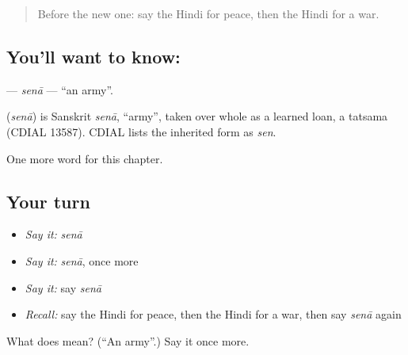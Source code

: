 \begin{quote}
Before the new one: say the Hindi for peace, then the Hindi for a war.
\end{quote}

\subsection*{You'll want to know: }
\textbf{} — \emph{senā} — \textquotedblleft{}an army\textquotedblright{}.

\begin{cousinweb}
\textbf{} (\emph{senā}) is Sanskrit \emph{senā}, \textquotedblleft{}army\textquotedblright{}, taken over whole as a learned loan, a tatsama (CDIAL 13587). CDIAL lists the inherited form as \emph{sen}.
\end{cousinweb}

\begin{grammarlens}[title={What you've built}]
One more word for this chapter.
\end{grammarlens}

\subsection*{Your turn}
\begin{itemize}
\raggedright
  \item \emph{Say it:} \emph{senā}
  \item \emph{Say it:} \emph{senā}, once more
  \item \emph{Say it:} say \emph{senā}
  \item \emph{Recall:} say the Hindi for peace, then the Hindi for a war, then say \emph{senā} again
\end{itemize}

\begin{tcolorbox}[breakable,colback=teal!4,colframe=teal!35!black,title={Before you move on}]
What does  mean? (\textquotedblleft{}An army\textquotedblright{}.) Say it once more.
\end{tcolorbox}

